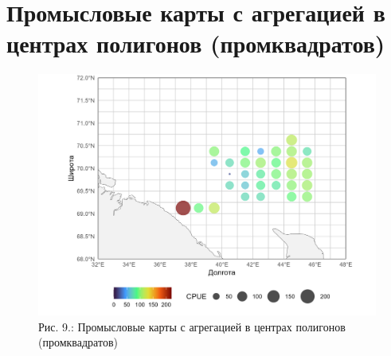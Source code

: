 \documentclass[
  letterpaper,
  DIV=11,
  numbers=noendperiod]{scrreprt}
\begin{document}
\section{Промысловые карты с агрегацией в центрах полигонов
(промквадратов)}\label{ux43fux440ux43eux43cux44bux441ux43bux43eux432ux44bux435-ux43aux430ux440ux442ux44b-ux441-ux430ux433ux440ux435ux433ux430ux446ux438ux435ux439-ux432-ux446ux435ux43dux442ux440ux430ux445-ux43fux43eux43bux438ux433ux43eux43dux43eux432-ux43fux440ux43eux43cux43aux432ux430ux434ux440ux430ux442ux43eux432}

\begin{figure}[H]

{\centering \includegraphics[width=0.8\linewidth,height=\textheight,keepaspectratio]{images/KARTOGRAPH9.jpg}

}

\caption{Рис. 9.: Промысловые карты с агрегацией в центрах полигонов
(промквадратов)}

\end{figure}%
\end{document}
